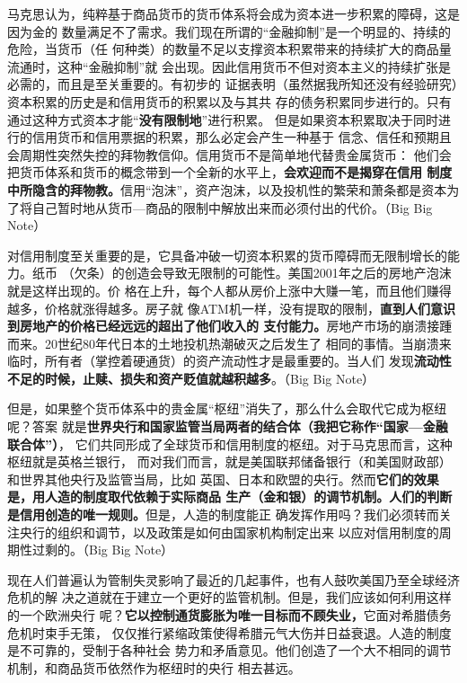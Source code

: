 马克思认为，纯粹基于商品货币的货币体系将会成为资本进一步积累的障碍，这是因为金的
数量满足不了需求。我们现在所谓的“金融抑制”是一个明显的、持续的危险，当货币（任
何种类）的数量不足以支撑资本积累带来的持续扩大的商品量流通时，这种“金融抑制”就
会出现。因此信用货币不但对资本主义的持续扩张是必需的，而且是至关重要的。有初步的
证据表明（虽然据我所知还没有经验研究）资本积累的历史是和信用货币的积累以及与其共
存的债务积累同步进行的。只有通过这种方式资本才能“\textbf{没有限制地}”进行积累。
但是如果资本积累取决于同时进行的信用货币和信用票据的积累，那么必定会产生一种基于
信念、信任和预期且会周期性突然失控的拜物教信仰。信用货币不是简单地代替贵金属货币：
他们会把货币体系和货币的概念带到一个全新的水平上，\textbf{会欢迎而不是揭穿在信用
  制度中所隐含的拜物教。}信用“泡沫”，资产泡沫，以及投机性的繁荣和萧条都是资本为
了将自己暂时地从货币—商品的限制中解放出来而必须付出的代价。（Big Big Note）

对信用制度至关重要的是，它具备冲破一切资本积累的货币障碍而无限制增长的能力。纸币
（欠条）的创造会导致无限制的可能性。美国2001年之后的房地产泡沫就是这样出现的。价
格在上升，每个人都从房价上涨中大赚一笔，而且他们赚得越多，价格就涨得越多。房子就
像ATM机一样，没有提取的限制，\textbf{直到人们意识到房地产的价格已经远远的超出了他们收入的
支付能力。}房地产市场的崩溃接踵而来。20世纪80年代日本的土地投机热潮破灭之后发生了
相同的事情。当崩溃来临时，所有者（掌控着硬通货）的资产流动性才是最重要的。当人们
发现\textbf{流动性不足的时候，止赎、损失和资产贬值就越积越多}。（Big Big Note）

但是，如果整个货币体系中的贵金属“枢纽”消失了，那么什么会取代它成为枢纽呢？答案
就是\textbf{世界央行和国家监管当局两者的结合体（我把它称作“国家—金融联合体”）}，
它们共同形成了全球货币和信用制度的枢纽。对于马克思而言，这种枢纽就是英格兰银行，
而对我们而言，就是美国联邦储备银行（和美国财政部）和世界其他央行及监管当局，比如
英国、日本和欧盟的央行。然而\textbf{它们的效果是，用人造的制度取代依赖于实际商品
  生产（金和银）的调节机制。人们的判断是信用创造的唯一规则。}但是，人造的制度能正
确发挥作用吗？我们必须转而关注央行的组织和调节，以及政策是如何由国家机构制定出来
以应对信用制度的周期性过剩的。（Big Big Note）

现在人们普遍认为管制失灵影响了最近的几起事件，也有人鼓吹美国乃至全球经济危机的解
决之道就在于建立一个更好的监管机制。但是，我们应该如何利用这样的一个欧洲央行
呢？\textbf{它以控制通货膨胀为唯一目标而不顾失业，}它面对希腊债务危机时束手无策，
仅仅推行紧缩政策使得希腊元气大伤并日益衰退。人造的制度是不可靠的，受制于各种社会
势力和矛盾意见。他们创造了一个大不相同的调节机制，和商品货币依然作为枢纽时的央行
相去甚远。

